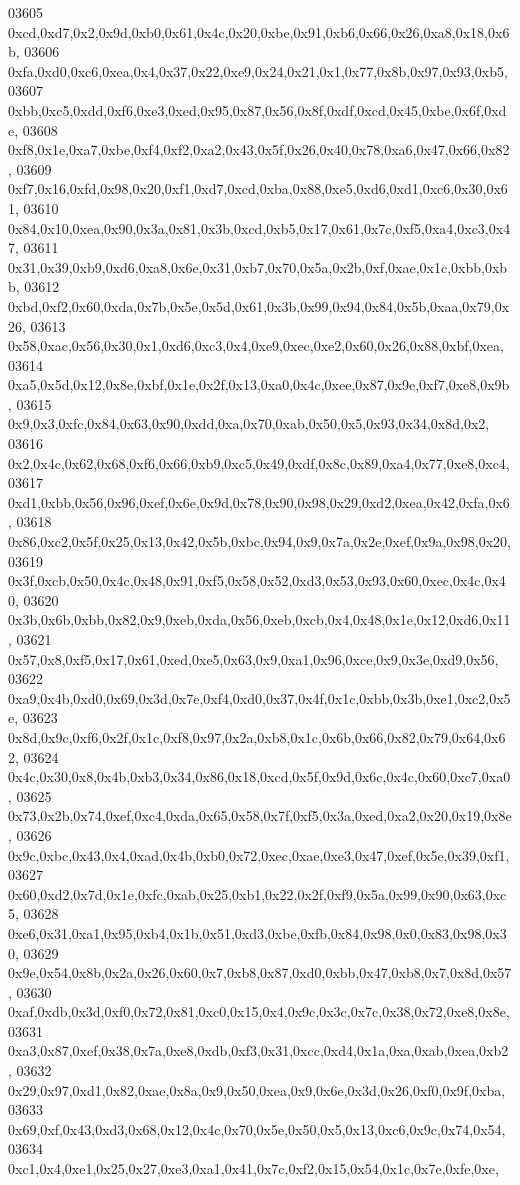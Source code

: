 \begin{DoxyCode}
03605   0xcd,0xd7,0x2,0x9d,0xb0,0x61,0x4c,0x20,0xbe,0x91,0xb6,0x66,0x26,0xa8,0x18,0x6b,
03606   0xfa,0xd0,0xc6,0xea,0x4,0x37,0x22,0xe9,0x24,0x21,0x1,0x77,0x8b,0x97,0x93,0xb5,
03607   0xbb,0xc5,0xdd,0xf6,0xe3,0xed,0x95,0x87,0x56,0x8f,0xdf,0xcd,0x45,0xbe,0x6f,0xde,
03608   0xf8,0x1e,0xa7,0xbe,0xf4,0xf2,0xa2,0x43,0x5f,0x26,0x40,0x78,0xa6,0x47,0x66,0x82,
03609   0xf7,0x16,0xfd,0x98,0x20,0xf1,0xd7,0xcd,0xba,0x88,0xe5,0xd6,0xd1,0xc6,0x30,0x61,
03610   0x84,0x10,0xea,0x90,0x3a,0x81,0x3b,0xcd,0xb5,0x17,0x61,0x7c,0xf5,0xa4,0xc3,0x47,
03611   0x31,0x39,0xb9,0xd6,0xa8,0x6e,0x31,0xb7,0x70,0x5a,0x2b,0xf,0xae,0x1c,0xbb,0xbb,
03612   0xbd,0xf2,0x60,0xda,0x7b,0x5e,0x5d,0x61,0x3b,0x99,0x94,0x84,0x5b,0xaa,0x79,0x26,
03613   0x58,0xac,0x56,0x30,0x1,0xd6,0xc3,0x4,0xe9,0xec,0xe2,0x60,0x26,0x88,0xbf,0xea,
03614   0xa5,0x5d,0x12,0x8e,0xbf,0x1e,0x2f,0x13,0xa0,0x4c,0xee,0x87,0x9e,0xf7,0xe8,0x9b,
03615   0x9,0x3,0xfc,0x84,0x63,0x90,0xdd,0xa,0x70,0xab,0x50,0x5,0x93,0x34,0x8d,0x2,
03616   0x2,0x4c,0x62,0x68,0xf6,0x66,0xb9,0xc5,0x49,0xdf,0x8c,0x89,0xa4,0x77,0xe8,0xc4,
03617   0xd1,0xbb,0x56,0x96,0xef,0x6e,0x9d,0x78,0x90,0x98,0x29,0xd2,0xea,0x42,0xfa,0x6,
03618   0x86,0xc2,0x5f,0x25,0x13,0x42,0x5b,0xbc,0x94,0x9,0x7a,0x2e,0xef,0x9a,0x98,0x20,
03619   0x3f,0xcb,0x50,0x4c,0x48,0x91,0xf5,0x58,0x52,0xd3,0x53,0x93,0x60,0xec,0x4c,0x40,
03620   0x3b,0x6b,0xbb,0x82,0x9,0xeb,0xda,0x56,0xeb,0xcb,0x4,0x48,0x1e,0x12,0xd6,0x11,
03621   0x57,0x8,0xf5,0x17,0x61,0xed,0xe5,0x63,0x9,0xa1,0x96,0xce,0x9,0x3e,0xd9,0x56,
03622   0xa9,0x4b,0xd0,0x69,0x3d,0x7e,0xf4,0xd0,0x37,0x4f,0x1c,0xbb,0x3b,0xe1,0xc2,0x5e,
03623   0x8d,0x9c,0xf6,0x2f,0x1c,0xf8,0x97,0x2a,0xb8,0x1c,0x6b,0x66,0x82,0x79,0x64,0x62,
03624   0x4c,0x30,0x8,0x4b,0xb3,0x34,0x86,0x18,0xcd,0x5f,0x9d,0x6c,0x4c,0x60,0xc7,0xa0,
03625   0x73,0x2b,0x74,0xef,0xc4,0xda,0x65,0x58,0x7f,0xf5,0x3a,0xed,0xa2,0x20,0x19,0x8e,
03626   0x9c,0xbc,0x43,0x4,0xad,0x4b,0xb0,0x72,0xec,0xae,0xe3,0x47,0xef,0x5e,0x39,0xf1,
03627   0x60,0xd2,0x7d,0x1e,0xfc,0xab,0x25,0xb1,0x22,0x2f,0xf9,0x5a,0x99,0x90,0x63,0xc5,
03628   0xe6,0x31,0xa1,0x95,0xb4,0x1b,0x51,0xd3,0xbe,0xfb,0x84,0x98,0x0,0x83,0x98,0x30,
03629   0x9e,0x54,0x8b,0x2a,0x26,0x60,0x7,0xb8,0x87,0xd0,0xbb,0x47,0xb8,0x7,0x8d,0x57,
03630   0xaf,0xdb,0x3d,0xf0,0x72,0x81,0xc0,0x15,0x4,0x9c,0x3c,0x7c,0x38,0x72,0xe8,0x8e,
03631   0xa3,0x87,0xef,0x38,0x7a,0xe8,0xdb,0xf3,0x31,0xcc,0xd4,0x1a,0xa,0xab,0xea,0xb2,
03632   0x29,0x97,0xd1,0x82,0xae,0x8a,0x9,0x50,0xea,0x9,0x6e,0x3d,0x26,0xf0,0x9f,0xba,
03633   0x69,0xf,0x43,0xd3,0x68,0x12,0x4c,0x70,0x5e,0x50,0x5,0x13,0xc6,0x9c,0x74,0x54,
03634   0xc1,0x4,0xe1,0x25,0x27,0xe3,0xa1,0x41,0x7c,0xf2,0x15,0x54,0x1c,0x7e,0xfe,0xe,

\end{DoxyCode}
